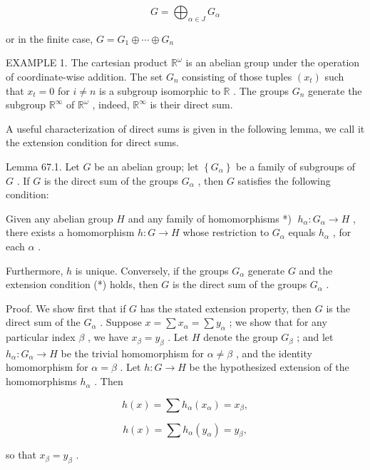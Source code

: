 \documentclass[10pt]{article}
\begin{document}
\[
G = {\bigoplus }_{\alpha  \in  J}{G}_{\alpha }
\]

or in the finite case, \(G = {G}_{1} \oplus  \cdots  \oplus  {G}_{n}\)

EXAMPLE 1. The cartesian product \({\mathbb{R}}^{\omega }\) is an abelian group under the operation of coordinate-wise addition. The set \({G}_{n}\) consisting of those tuples \(\left( {x}_{t}\right)\) such that \({x}_{t} = 0\) for \(i \neq  n\) is a subgroup isomorphic to \(\mathbb{R}\) . The groups \({G}_{n}\) generate the subgroup \({\mathbb{R}}^{\infty }\) of \({\mathbb{R}}^{\omega }\) , indeed, \({\mathbb{R}}^{\infty }\) is their direct sum.

A useful characterization of direct sums is given in the following lemma, we call it the extension condition for direct sums.

Lemma 67.1. Let \(G\) be an abelian group; let \(\left\{  {G}_{\alpha }\right\}\) be a family of subgroups of \(G\) . If \(G\) is the direct sum of the groups \({G}_{\alpha }\) , then \(G\) satisfies the following condition:

Given any abelian group \(H\) and any family of homomorphisms *) \(\;{h}_{\alpha } : {G}_{\alpha } \rightarrow  H\) , there exists a homomorphism \(h : G \rightarrow  H\) whose restriction to \({G}_{\alpha }\) equals \({h}_{\alpha }\) , for each \(\alpha\) .

Furthermore, \(h\) is unique. Conversely, if the groups \({G}_{\alpha }\) generate \(G\) and the extension condition (*) holds, then \(G\) is the direct sum of the groups \({G}_{\alpha }\) .

Proof. We show first that if \(G\) has the stated extension property, then \(G\) is the direct sum of the \({G}_{\alpha }\) . Suppose \(x = \sum {x}_{\alpha } = \sum {y}_{\alpha }\) ; we show that for any particular index \(\beta\) , we have \({x}_{\beta } = {y}_{\beta }\) . Let \(H\) denote the group \({G}_{\beta }\) ; and let \({h}_{\alpha } : {G}_{\alpha } \rightarrow  H\) be the trivial homomorphism for \(\alpha  \neq  \beta\) , and the identity homomorphism for \(\alpha  = \beta\) . Let \(h : G \rightarrow  H\) be the hypothesized extension of the homomorphisms \({h}_{\alpha }\) . Then

\[
h\left( x\right)  = \sum {h}_{\alpha }\left( {x}_{\alpha }\right)  = {x}_{\beta },
\]

\[
h\left( x\right)  = \sum {h}_{\alpha }\left( {y}_{\alpha }\right)  = {y}_{\beta },
\]

so that \({x}_{\beta } = {y}_{\beta }\) .
\end{document}
